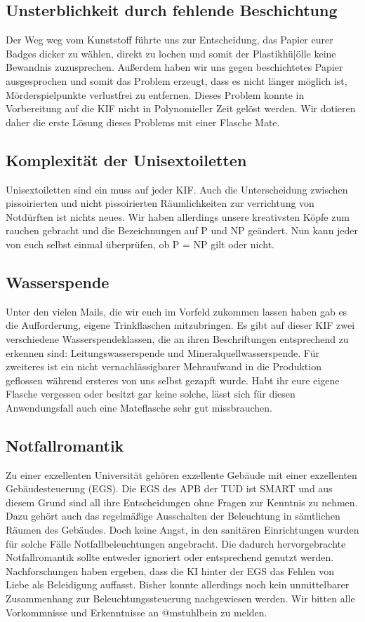 \subsection*{Unsterblichkeit durch fehlende Beschichtung}
Der Weg weg vom Kunststoff führte uns zur Entscheidung, das Papier eurer Badges dicker zu wählen,
direkt zu lochen und somit der Plastikh{ü|ö}lle keine Bewandnis zuzusprechen. Außerdem haben wir uns
gegen beschichtetes Papier ausgesprochen und somit das Problem erzeugt, dass es nicht länger möglich
ist, Mörderspielpunkte verlustfrei zu entfernen. Dieses Problem konnte in Vorbereitung auf die KIF
nicht in Polynomieller Zeit gelöst werden. Wir dotieren daher die erste Lösung dieses Problems mit
einer Flasche Mate.

\subsection*{Komplexität der Unisextoiletten}
Unisextoiletten sind ein muss auf jeder KIF. Auch die Unterscheidung zwischen pissoirierten und
nicht pissoirierten Räumlichkeiten zur verrichtung von Notdürften ist nichts neues. Wir haben
allerdings unsere kreativsten Köpfe zum rauchen gebracht und die Bezeichnungen auf P und NP
geändert. Nun kann jeder von euch selbst einmal überprüfen, ob P = NP gilt oder nicht.

\subsection*{Wasserspende}
Unter den vielen Mails, die wir euch im Vorfeld zukommen lassen haben gab es die Aufforderung,
eigene Trinkflaschen mitzubringen. Es gibt auf dieser KIF zwei verschiedene Wasserspendeklassen, die
an ihren Beschriftungen entsprechend zu erkennen sind: Leitungswasserspende und
Mineralquellwasserspende. Für zweiteres ist ein nicht vernachlässigbarer Mehraufwand in die
Produktion geflossen während ersteres von uns selbst gezapft wurde. Habt ihr eure eigene Flasche
vergessen oder besitzt gar keine solche, lässt sich für diesen Anwendungsfall auch eine Mateflasche
sehr gut missbrauchen.

\subsection*{Notfallromantik}
Zu einer exzellenten Universität gehören exzellente Gebäude mit einer exzellenten Gebäudesteuerung
(EGS). Die EGS des APB der TUD ist SMART und aus diesem Grund sind all ihre Entscheidungen ohne
Fragen zur Kenntnis zu nehmen. Dazu gehört auch das regelmäßige Ausschalten der Beleuchtung in
sämtlichen Räumen des Gebäudes. Doch keine Angst, in den sanitären Einrichtungen wurden für solche
Fälle Notfallbeleuchtungen angebracht. Die dadurch hervorgebrachte Notfallromantik sollte entweder
ignoriert oder entsprechend genutzt werden. Nachforschungen haben ergeben, dass die KI hinter der
EGS das Fehlen von Liebe als Beleidigung auffasst. Bisher konnte allerdings noch kein unmittelbarer
Zusammenhang zur Beleuchtungssteuerung nachgewiesen werden. Wir bitten alle Vorkommnisse und
Erkenntnisse an @mstuhlbein zu melden.

